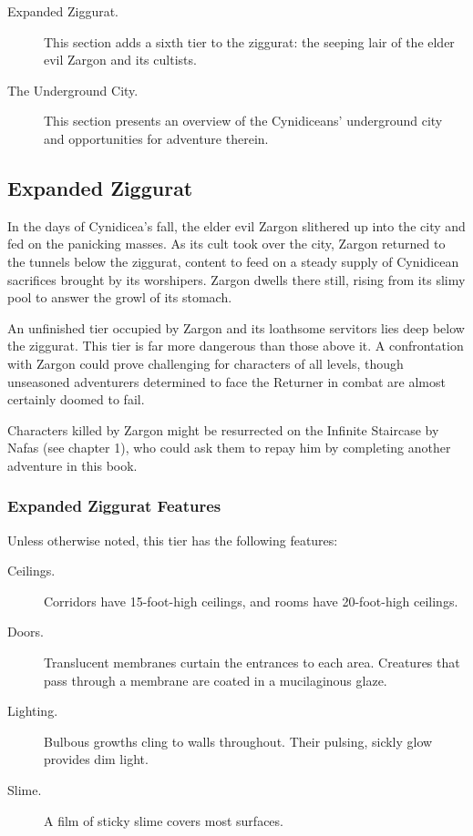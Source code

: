\documentclass[10pt,a4paper,twoside,bg=print,twocolumn,openany,nodeprecatedcode]{dndbook}
\begin{document}
\begin{description}
\item[Expanded Ziggurat.]
This section adds a sixth tier to the ziggurat: the seeping lair of the elder evil Zargon and its cultists.
\item[The Underground City.]
This section presents an overview of the Cynidiceans' underground city and opportunities for adventure therein.
\end{description}

\subsection{Expanded Ziggurat}
In the days of Cynidicea's fall, the elder evil Zargon slithered up into the city and fed on the panicking masses. As its cult took over the city, Zargon returned to the tunnels below the ziggurat, content to feed on a steady supply of Cynidicean sacrifices brought by its worshipers. Zargon dwells there still, rising from its slimy pool to answer the growl of its stomach.

An unfinished tier occupied by Zargon and its loathsome servitors lies deep below the ziggurat. This tier is far more dangerous than those above it. A confrontation with Zargon could prove challenging for characters of all levels, though unseasoned adventurers determined to face the Returner in combat are almost certainly doomed to fail.

Characters killed by Zargon might be resurrected on the Infinite Staircase by Nafas (see chapter 1), who could ask them to repay him by completing another adventure in this book.

\subsubsection{Expanded Ziggurat Features}
Unless otherwise noted, this tier has the following features:


\begin{description}
\item[Ceilings.]
Corridors have 15-foot-high ceilings, and rooms have 20-foot-high ceilings.
\item[Doors.]
Translucent membranes curtain the entrances to each area. Creatures that pass through a membrane are coated in a mucilaginous glaze.
\item[Lighting.]
Bulbous growths cling to walls throughout. Their pulsing, sickly glow provides dim light.
\item[Slime.]
A film of sticky slime covers most surfaces.
\end{description}
\end{document}
